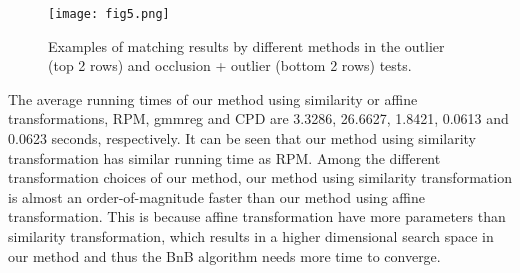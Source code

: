 \documentclass[11pt,bezier,]{article}
\begin{document}
\begin{figure}[ht]
\centering

\texttt{[image: fig5.png]}


% 
% 


    \caption{
Examples of matching results by different methods 
in the outlier (top 2 rows) and occlusion + outlier (bottom 2 rows) tests.
\label{two_test_exa}}
\end{figure}


The average running times of our method using similarity or affine transformations,
RPM, gmmreg and CPD  are 
    3.3286, 
   26.6627,
      1.8421,
    0.0613 and
    0.0623 seconds, respectively.
It can be seen that our method using similarity transformation has similar running time as RPM.
Among the different transformation choices of our method,
our method using similarity transformation is almost an order-of-magnitude  faster than
our method using affine transformation.
This is because affine transformation have more parameters than similarity transformation,
which results in a higher dimensional search space in our method
and thus the BnB algorithm needs more time  to converge.
    
\end{document}
